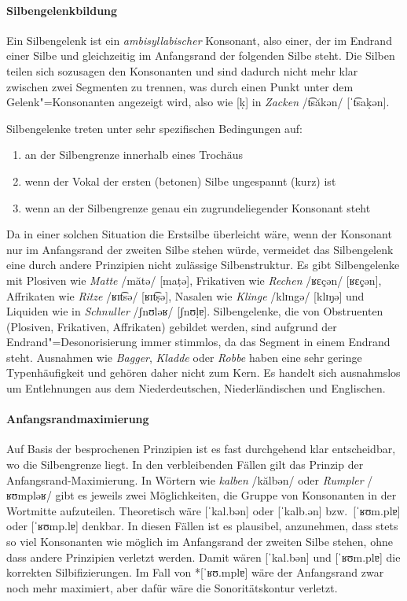 \paragraph*{Silbengelenkbildung}

Ein Silbengelenk ist ein \textit{ambisyllabischer} Konsonant, also einer, der im Endrand einer Silbe und gleichzeitig im Anfangsrand der folgenden Silbe steht.
Die Silben teilen sich sozusagen den Konsonanten und sind dadurch nicht mehr klar zwischen zwei Segmenten zu trennen, was durch einen Punkt unter dem Gelenk"=Konsonanten angezeigt wird, also wie [ḳ] in \textit{Zacken} /t͡săkən/ [ˈt͡saḳən].

Silbengelenke treten unter sehr spezifischen Bedingungen auf:

\begin{enumerate}
  \item an der Silbengrenze innerhalb eines Trochäus
  \item wenn der Vokal der ersten (betonen) Silbe ungespannt (kurz) ist
  \item wenn an der Silbengrenze genau ein zugrundeliegender Konsonant steht
\end{enumerate}

Da in einer solchen Situation die Erstsilbe überleicht wäre, wenn der Konsonant nur im Anfangsrand der zweiten Silbe stehen würde, vermeidet das Silbengelenk eine durch andere Prinzipien nicht zulässige Silbenstruktur.
Es gibt Silbengelenke mit Plosiven wie \textit{Matte} /mătə/ [maṭə], Frikativen wie \textit{Rechen} /ʁɛçən/ [ʁɛç̣ən], Affrikaten wie \textit{Ritze} /ʁɪt͡sə/ [ʁɪt͡ṣə], Nasalen wie \textit{Klinge} /klɪngə/ [klɪŋ̣ə] und Liquiden wie in \textit{Schnuller} /ʃnʊləʁ/ [ʃnʊḷɐ].
Silbengelenke, die von Obstruenten (Plosiven, Frikativen, Affrikaten) gebildet werden, sind aufgrund der Endrand"=Desonorisierung immer stimmlos, da das Segment in einem Endrand steht.
Ausnahmen wie \textit{Bagger}, \textit{Kladde} oder \textit{Robbe} haben eine sehr geringe Typenhäufigkeit und gehören daher nicht zum Kern.
Es handelt sich ausnahmslos um Entlehnungen aus dem Niederdeutschen, Niederländischen und Englischen.

\paragraph*{Anfangsrandmaximierung}

Auf Basis der besprochenen Prinzipien ist es fast durchgehend klar entscheidbar, wo die Silbengrenze liegt.
In den verbleibenden Fällen gilt das Prinzip der Anfangsrand-Maximierung.
In Wörtern wie \textit{kalben} /kălbən/ oder \textit{Rumpler} /ʁʊmpləʁ/ gibt es jeweils zwei Möglichkeiten, die Gruppe von Konsonanten in der Wortmitte aufzuteilen.
Theoretisch wäre [ˈkal.bən] oder [ˈkalb.ən] bzw.\ [ˈʁʊm.plɐ] oder [ˈʁʊmp.lɐ] denkbar.
In diesen Fällen ist es plausibel, anzunehmen, dass stets so viel Konsonanten wie möglich im Anfangsrand der zweiten Silbe stehen, ohne dass andere Prinzipien verletzt werden.
Damit wären [ˈkal.bən] und [ˈʁʊm.plɐ] die korrekten Silbifizierungen.
Im Fall von *[ˈʁʊ.mplɐ] wäre der Anfangsrand zwar noch mehr maximiert, aber dafür wäre die Sonoritätskontur verletzt.

